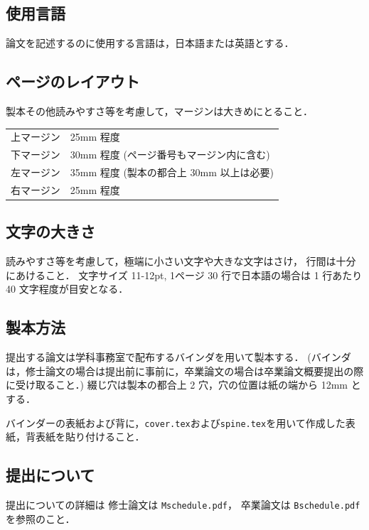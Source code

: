 \documentclass[12pt]{jreport}
\begin{document}
\subsection{使用言語}
論文を記述するのに使用する言語は，日本語または英語とする．
%
\subsection{ページのレイアウト}
製本その他読みやすさ等を考慮して，マージンは大きめにとること．

\vspace*{3mm}
\hspace*{10mm}
\begin{tabular}{ll}
上マージン & 25mm 程度 \\
下マージン & 30mm 程度 (ページ番号もマージン内に含む) \\
左マージン & 35mm 程度 (製本の都合上 30mm 以上は必要) \\
右マージン & 25mm 程度 \\
\end{tabular}

\subsection{文字の大きさ}
読みやすさ等を考慮して，極端に小さい文字や大きな文字はさけ， 行間は十分にあけること． 
文字サイズ 11-12pt, 1ページ 30 行で日本語の場合は 1 行あたり 40 文字程度が目安となる． 

\subsection{製本方法}
提出する論文は学科事務室で配布するバインダを用いて製本する．
(バインダは，修士論文の場合は提出前に事前に，卒業論文の場合は卒業論文概要提出の際に受け取ること．)
綴じ穴は製本の都合上 2 穴，穴の位置は紙の端から 12mm とする． 

バインダーの表紙および背に，{\tt cover.tex\/}および{\tt spine.tex\/}を用いて作成した表紙，背表紙を貼り付けること． 

\subsection{提出について}
提出についての詳細は
修士論文は {\tt Mschedule.pdf}，
卒業論文は {\tt Bschedule.pdf} を参照のこと．

\newpage
\end{document}
